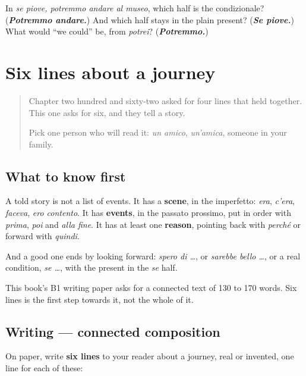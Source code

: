 \begin{tcolorbox}[breakable,colback=teal!4,colframe=teal!35!black,title={Before you move on}]
In \emph{se piove, potremmo andare al museo}, which half is the condizionale? (\emph{\textbf{Potremmo andare.}}) And which half stays in the plain present? (\emph{\textbf{Se piove.}}) What would \textquotedblleft{}we could\textquotedblright{} be, from \emph{potrei}? (\emph{\textbf{Potremmo.}})
\end{tcolorbox}
\section[(six lines)]{Six lines about a journey}

\label{lesson:IT-W272-sei-righe}



\begin{quote}
Chapter two hundred and sixty-two asked for four lines that held together. This one asks for six, and they tell a story.

Pick one person who will read it: \emph{un amico}, \emph{un'amica}, someone in your family.
\end{quote}

\subsection*{What to know first}
A told story is not a list of events. It has a \textbf{scene}, in the imperfetto: \emph{era}, \emph{c'era}, \emph{faceva}, \emph{ero contento}. It has \textbf{events}, in the passato prossimo, put in order with \emph{prima}, \emph{poi} and \emph{alla fine}. It has at least one \textbf{reason}, pointing back with \emph{perché} or forward with \emph{quindi}.

And a good one ends by looking forward: \emph{spero di …}, or \emph{sarebbe bello …}, or a real condition, \emph{se …}, with the present in the \emph{se} half.

This book's B1 writing paper asks for a connected text of 130 to 170 words. Six lines is the first step towards it, not the whole of it.

\subsection*{Writing — connected composition}
On paper, write \textbf{six lines} to your reader about a journey, real or invented, one line for each of these:

